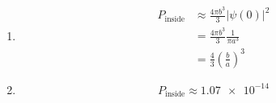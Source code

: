 \documentclass{article}
\begin{document}
\begin{enumerate}
  \item

        \begin{align*}
          P_\text{inside} & \approx \frac{4 \pi b^3}{3} |\psi(0)|^2    \\
                          & = \frac{4 \pi b^3}{3} \frac{1}{\pi a^3}    \\
                          & = \frac{4}{3} \left( \frac{b}{a} \right)^3
        \end{align*}

  \item

        \[P_\text{inside} \approx \num{1.07e-14}\]
\end{enumerate}

\subsection{}
\end{document}
